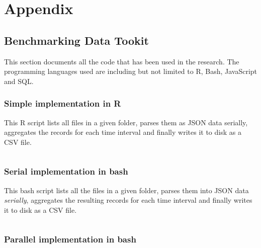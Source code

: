 \chapter{Appendix}

\section{Benchmarking Data Tookit} \label{appendix:benchmark}

This section documents all the code that has been used in the research.
The programming languages used are including but not limited to R, Bash, JavaScript and SQL.

\subsection{Simple implementation in R}
This R script lists all files in a given folder, parses them as JSON data serially, aggregates the records for each time interval and finally writes it to disk as a CSV file.
\vspace{1em}
\inputminted{R}{analysis/data-toolkit/old-toolkit.r}

\subsection{Serial implementation in bash}
This bash script lists all the files in a given folder, parses them into JSON data \textit{serially}, aggregates the resulting records for each time interval and finally writes it to disk as a CSV file.
\vspace{1em}
\inputminted{bash}{analysis/data-toolkit/new-toolkit.sh}

\subsection{Parallel implementation in bash}

